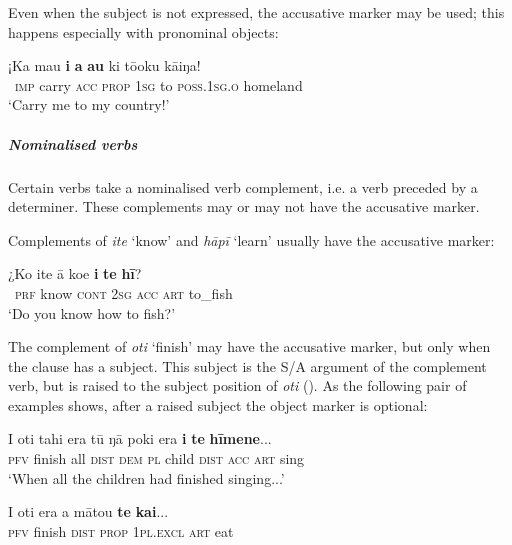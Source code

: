 Even when the subject is not expressed, the accusative marker may be used; this happens especially with pronominal objects:

\ea\label{ex:8.34}
\gll ¡Ka ma{\ꞌ}u \textbf{i} \textbf{a} \textbf{au} ki tō{\ꞌ}oku kāiŋa!\\
~\textsc{imp} carry \textsc{acc} \textsc{prop} \textsc{1sg} to \textsc{poss.1sg.o} homeland\\

\glt 
‘Carry me to my country!’ \textstyleExampleref{[Ley-9-55.089]}
\z

\subparagraph{Nominalised verbs} Certain verbs take a nominalised verb complement, i.e. a verb preceded by a determiner. These complements may or may not have the accusative marker.

Complements of \textit{{\ꞌ}ite} ‘know’ and \textit{hāpī} ‘learn’ usually have the accusative marker:

\ea\label{ex:8.35}
\gll ¿Ko {\ꞌ}ite {\ꞌ}ā koe \textbf{i} \textbf{te} \textbf{hī}?\\
~\textsc{prf} know \textsc{cont} \textsc{2sg} \textsc{acc} \textsc{art} to\_fish\\

\glt
‘Do you know how to fish?’ \textstyleExampleref{[R245.101]} 
\z

The complement of \textit{oti} ‘finish’ may have the accusative marker, but only when the clause has a subject. This subject is the S/A argument of the complement verb, but is raised to the subject position of \textit{oti} (). As the following pair of examples shows, after a raised subject the object marker is optional:

\ea\label{ex:8.36}
\gll I oti tahi era tū ŋā poki era \textbf{i} \textbf{te} \textbf{hīmene}...\\
\textsc{pfv} finish all \textsc{dist} \textsc{dem} \textsc{pl} child \textsc{dist} \textsc{acc} \textsc{art} sing\\

\glt 
‘When all the children had finished singing...’ \textstyleExampleref{[R315.353]} 
\z

\ea\label{ex:8.37}
\gll I oti era a mātou \textbf{te} \textbf{kai}...\\
\textsc{pfv} finish \textsc{dist} \textsc{prop} \textsc{1pl.excl} \textsc{art} eat\\

